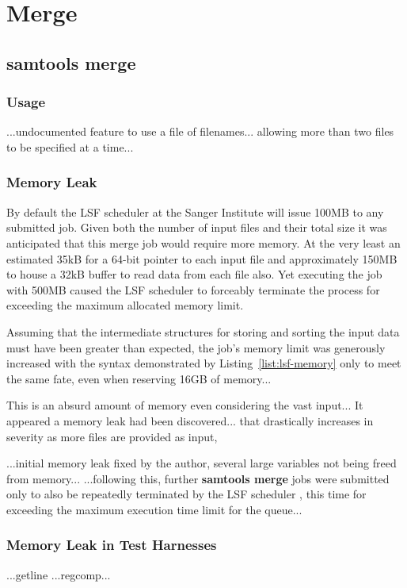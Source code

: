 \section{Merge}

\subsection{samtools merge}

\subsubsection{Usage}
...undocumented feature to use a file of filenames... allowing more than two
files to be specified at a time...

\subsubsection{Memory Leak}

By default the LSF scheduler at the Sanger Institute will issue 100MB to any
submitted job. Given both the number of input files and their total size it was
anticipated that this merge job would require more memory. At the very least an
estimated 35kB for a 64-bit pointer to each input file and approximately 150MB
to house a 32kB buffer to read data from each file also. Yet executing the job
with 500MB caused the LSF scheduler to forceably terminate the process for
exceeding the maximum allocated memory limit.

Assuming that the intermediate structures for storing and sorting the input data
must have been greater than expected, the job's memory limit was generously
increased with the syntax demonstrated by Listing~\ref{list:lsf-memory} only to
meet the same fate, even when reserving 16GB of memory...

This is an absurd amount of memory even considering the vast input...
It appeared a memory leak had been discovered...
that drastically increases in severity as more files are provided as input,

...initial memory leak fixed by the author, several large variables not being
freed from memory...
...following this, further \textbf{samtools merge} jobs were submitted only to
also be repeatedly terminated by the LSF scheduler , this time for exceeding the
maximum execution time limit for the queue...

\subsubsection{Memory Leak in Test Harnesses}
...getline
...regcomp...

